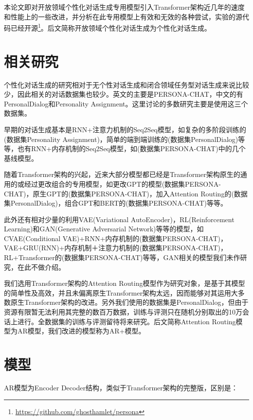 \documentclass[letterpaper]{article} %
\DeclareRobustCommand{\citeext}[1]{\cite[#1]{#1}}
\begin{document}
\begin{CJK*}{UTF8}{gbsn}
本论文即对开放领域个性化对话生成专用模型\citeext{Zheng2019}引入Transformer架构近几年的速度和性能上的一些改进，并分析在此专用模型上有效和无效的各种尝试，实验的源代码已经开源\footnote{\url{https://github.com/ghosthamlet/persona}}。后文简称开放领域个性化对话生成为个性化对话生成。

\section[Related Works]{相关研究} 
个性化对话生成的研究相对于无个性对话生成和闭合领域任务型对话生成来说比较少，因此相关的对话数据集也较少。英文的主要是PERSONA-CHAT\citeext{Zhang2018}，中文的有PersonalDialog\citeext{Zheng2019a}和Personality Assignment\citeext{Qian2017}。这里讨论的多数研究主要是使用这三个数据集。

早期的对话生成基本是RNN+注意力机制\citeext{Bahdanau2015}的Seq2Seq模型\citeext{SutskeverGoogle2014}，如复杂的多阶段训练的\citeext{Qian2017}(数据集Personality Assignment)，简单的端到端训练的\citeext{Zheng2019a}(数据集PersonalDialog)等等，也有RNN+内存机制\citeext{Sukhbaatar2015}的Seq2Seq模型，如\citeext{Zhang2018}(数据集PERSONA-CHAT)中的几个基线模型。

随着Transformer架构的兴起，近来大部分模型都已经是Transformer架构原生的通用的或经过更改组合的专用模型，如更改GPT\citeext{Radford2018}的模型\citeext{Tselousov2018}(数据集PERSONA-CHAT)，原生GPT的\citeext{Wolf2019}(数据集PERSONA-CHAT)，加入Attention Routing的\citeext{Zheng2019}(数据集PersonalDialog)，组合GPT和BERT的\citeext{Liu2020}(数据集PERSONA-CHAT)等等。

此外还有相对少量的利用VAE(Variational AutoEncoder)，RL(Reinforcement Learning)和GAN(Generative Adversarial Network)等等的模型，如CVAE(Conditional VAE)+RNN+内存机制的\citeext{Song2019}(数据集PERSONA-CHAT)，VAE+GRU(RNN)+内存机制＋注意力机制的\citeext{Xu2020}(数据集PERSONA-CHAT)，RL+Transformer的\citeext{Liu2020}(数据集PERSONA-CHAT)等等，GAN相关的模型我们未作研究，在此不做介绍。

我们选用Transformer架构的Attention Routing模型\citeext{Zheng2019}作为研究对象，是基于其模型的简单性及高效，并且未偏离原生Transformer架构太远，因而能够对其运用大多数原生Transformer架构的改进。另外我们使用的数据集是PersonalDialog，但由于资源有限暂无法利用其完整的数百万数据，训练与评测只在随机分别取出的10万会话上进行。全数据集的训练与评测留待将来研究。后文简称Attention Routing模型为AR模型，我们改进的模型称为AR+模型。

\section[Model]{模型} 
AR模型为Encoder Decoder结构，类似于Transformer架构的完整版\citeext{Vaswani2017}，区别是：


\end{CJK*}
\end{document}
